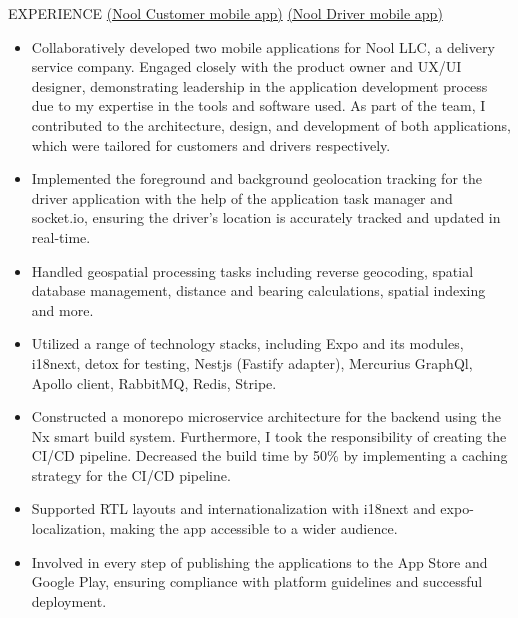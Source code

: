 \documentclass{resume} %
\begin{document}
\begin{rSection}{EXPERIENCE}
\href{https://apps.apple.com/us/app/nool/id6478508548}{(Nool Customer mobile app)}
\href{https://apps.apple.com/us/app/nool-driver/id6478509151}{(Nool Driver mobile app)}
 \begin{itemize}
    \itemsep -3pt {} 
        \item Collaboratively developed two mobile applications for Nool LLC, a delivery service company. Engaged closely with the product owner and UX/UI designer, demonstrating leadership in the application development process due to my expertise in the tools and software used. As part of the team, I contributed to the architecture, design, and development of both applications, which were tailored for customers and drivers respectively.
        \item Implemented the foreground and background geolocation tracking for the driver application with the help of the application task manager and socket.io, ensuring the driver's location is accurately tracked and updated in real-time.
        \item Handled geospatial processing tasks including reverse geocoding, spatial database management, distance and bearing calculations, spatial indexing and more.
        \item Utilized a range of technology stacks, including Expo and its modules, i18next, detox for testing, Nestjs (Fastify adapter), Mercurius GraphQl, Apollo client, RabbitMQ, Redis, Stripe.
        \item Constructed a monorepo microservice architecture for the backend using the Nx smart build system. Furthermore, I took the responsibility of creating the CI/CD pipeline. Decreased the build time by 50\% by implementing a caching strategy for the CI/CD pipeline.
        \item Supported RTL layouts and internationalization with i18next and expo-localization, making the app accessible to a wider audience. 
        \item Involved in every step of publishing the applications to the App Store and Google Play, ensuring compliance with platform guidelines and successful deployment.
 \end{itemize}


\end{rSection}
\end{document}
